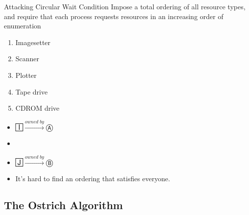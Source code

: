 \begin{frame}
  \begin{block}{Attacking Circular Wait Condition}
    Impose a total ordering of all resource types, and require that each process
    requests resources in an increasing order of enumeration 
  \end{block}
  \begin{center}
    \begin{minipage}{.3\linewidth}
      \begin{enumerate}
      \item Imagesetter
      \item Scanner
      \item Plotter
      \item Tape drive
      \item CDROM drive
      \end{enumerate}
    \end{minipage}\quad
    \begin{minipage}{.3\linewidth}\Large
      \begin{itemize}
      \item[] 🄸\(\xrightarrow{owned\;by}\)Ⓐ
      \item[] 
      \item[] 🄹\(\xrightarrow{owned\;by}\)Ⓑ
      \end{itemize}      
    \end{minipage}
  \end{center}
  \begin{itemize}
    \item[] It's hard to find an ordering that satisfies everyone.
  \end{itemize}
\end{frame}

\subsection{The Ostrich Algorithm}
\label{sec:ostrich-algorithm}

